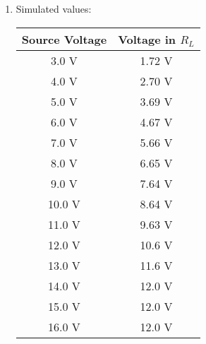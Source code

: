 \begin{tasks}
\begin{multicols}{2}
\begin{enumerate}
\item Simulated values:

\begin{center}
\begin{tabular}[.5cm]{ c c }
\toprule
Source Voltage & Voltage in $R_{L}$ \\
\midrule
3.0 V & 1.72 V \\
\cmidrule{1-2}
4.0 V & 2.70 V \\
\cmidrule{1-2}
5.0 V & 3.69 V \\
\cmidrule{1-2}
6.0 V & 4.67 V \\
\cmidrule{1-2}
7.0 V & 5.66 V \\
\cmidrule{1-2}
8.0 V & 6.65 V \\
\cmidrule{1-2}
9.0 V & 7.64 V \\
\cmidrule{1-2}
10.0 V & 8.64 V \\
\cmidrule{1-2}
11.0 V & 9.63 V \\
\cmidrule{1-2}
12.0 V & 10.6 V \\
\cmidrule{1-2}
13.0 V & 11.6 V \\
\cmidrule{1-2}
14.0 V & 12.0 V \\
\cmidrule{1-2}
15.0 V & 12.0 V \\
\cmidrule{1-2}
16.0 V & 12.0 V \\
\bottomrule
\end{tabular}
\end{center} 
\end{enumerate}
\end{multicols}
\end{tasks}

\pagebreak
